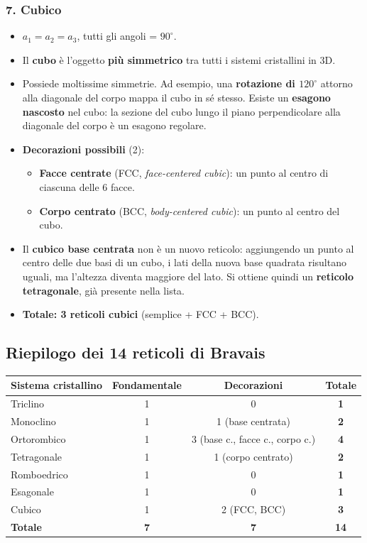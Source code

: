 \subsubsection{7. Cubico}
\begin{itemize}
    \item $a_1 = a_2 = a_3$, tutti gli angoli = $90^\circ$.
    \item Il \textbf{cubo} è l'oggetto \textbf{più simmetrico} tra tutti i sistemi cristallini in 3D.
    \item Possiede moltissime simmetrie. Ad esempio, una \textbf{rotazione di $120^\circ$} attorno alla diagonale del corpo mappa il cubo in sé stesso. Esiste un \textbf{esagono nascosto} nel cubo: la sezione del cubo lungo il piano perpendicolare alla diagonale del corpo è un esagono regolare.
    \item \textbf{Decorazioni possibili} (2):
    \begin{itemize}
        \item \textbf{Facce centrate} (FCC, \textit{face-centered cubic}): un punto al centro di ciascuna delle 6 facce.
        \item \textbf{Corpo centrato} (BCC, \textit{body-centered cubic}): un punto al centro del cubo.
    \end{itemize}
    \item Il \textbf{cubico base centrata} non è un nuovo reticolo: aggiungendo un punto al centro delle due basi di un cubo, i lati della nuova base quadrata risultano uguali, ma l'altezza diventa maggiore del lato. Si ottiene quindi un \textbf{reticolo tetragonale}, già presente nella lista.
    \item \textbf{Totale: 3 reticoli cubici} (semplice + FCC + BCC).
\end{itemize}

\subsection*{Riepilogo dei 14 reticoli di Bravais}

\begin{table}[h!]
\centering
\renewcommand{\arraystretch}{1.3}
\begin{tabular}{|l|c|c|c|}
\hline
\textbf{Sistema cristallino} & \textbf{Fondamentale} & \textbf{Decorazioni} & \textbf{Totale} \\ \hline
Triclino & 1 & 0 & \textbf{1} \\ \hline
Monoclino & 1 & 1 (base centrata) & \textbf{2} \\ \hline
Ortorombico & 1 & 3 (base c., facce c., corpo c.) & \textbf{4} \\ \hline
Tetragonale & 1 & 1 (corpo centrato) & \textbf{2} \\ \hline
Romboedrico & 1 & 0 & \textbf{1} \\ \hline
Esagonale & 1 & 0 & \textbf{1} \\ \hline
Cubico & 1 & 2 (FCC, BCC) & \textbf{3} \\ \hline
\textbf{Totale} & \textbf{7} & \textbf{7} & \textbf{14} \\ \hline
\end{tabular}
\end{table}

